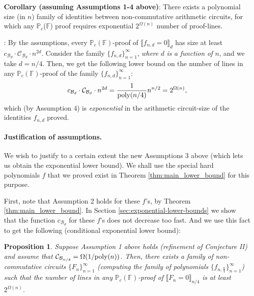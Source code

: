 \documentclass[12pt,reqno]{article}
\newcommand{\Comment}[1]{}%
\newtheorem*{proposition*}{Proposition}
\newcommand\F{\ensuremath{\mathbb F}}
\newcommand\PP{{\mathbb P}}
\newcommand\PC{\ensuremath{\PP_c}}
\newcommand{\poly}{\hbox{poly}}
\newcommand{\cd}{\cdot}
\newcommand {\ind} {\noindent}
\newcommand {\para}[1] {\paragraph{#1}}
\newenvironment{proof}{\QuadSpace\par\noindent{\bf Proof}:}{\EndProof\HalfSpace}
\newcommand{\QuadSpace}{\vspace{0.25\baselineskip}}
\newcommand{\HalfSpace}{\vspace{0.5\baselineskip}}
\newcommand{\EndProof}{ \hfill \vrule width 1ex height 1ex depth 0pt }
\begin{document}
\ind\textbf{Corollary (assuming Assumptions 1-4 above)}:
There exists a polynomial size (in $n$) family of identities between non-commutative arithmetic circuits, for which any \PC(\F) proof requires exponential $2^{\Omega(n)}$ number of proof-lines.

\begin{proof} By the assumptions, every $\PC(\F)$-proof of $\llbracket f_{n,d}=0 \rrbracket_d$ has size at least $c_{\mathcal B_d}\cd
\mathcal C_{\mathcal B_d}\cd n^{2d}$.  Consider the family $\{ f_{n,d}\}_{n=1}^\infty$, \textit{where $d$ is a function of $n$}, and we take  $d=n/4$. Then, we get the following lower bound on the number of lines in any    $\PC(\F)$-proof of the family $\{ f_{n,d}\}_{n=1}^\infty$:
\[c_{\mathcal B_d}\cd \mathcal C_{\mathcal B_d}\cd n^{2d}=\frac{1}{\poly(n/4)}n^{n/2}= 2^{\Omega(n)}
,
 \]
which (by Assumption 4) is \textit{exponential} in the arithmetic circuit-size of the identities \(f_{n,d}\) proved.
\end{proof}
\para{Justification of assumptions.}


We wish to justify to a certain extent the new Assumptions 3 above (which lets us obtain the exponential lower bound). We shall use the special hard polynomials $f$ that we proved exist in Theorem \ref{thm:main_lower_bound} for this purpose.

First, note that Assumption 2 holds for these $f$'s, by Theorem \ref{thm:main_lower_bound}.
  In Section \ref{sec:exponential-lower-bounds} we show that the function $c_{\mathcal B_d}$ for these $f$'s does not decrease too fast.
And we use this fact to get the following (conditional exponential lower bound):


\Comment{
That is, for the polynomial $f$ we can prove the following:
 $$Q_{\mathcal B_{n/4}}(f)=\Omega\left(\frac{2^n}{n^{5/2}\ln n}\right).$$
}


\begin{proposition*}
Suppose \emph{Assumption 1} above holds (refinement of Conjecture II) and assume that $\mathcal C_{\mathcal B_{n/4}}=
\Omega(1/{\rm poly}(n))$. Then, there exists a  family of
non-commutative circuits $\{F_n\}_{n=1}^\infty$ (computing the family of polynomials $\{f_{n,\frac{n}{4}}\}_{n=1}^\infty$)
such that  the number of lines in any $\PC(\F)$-proof of $\llbracket F_n= 0\rrbracket_{n/4}$ is at least $2^{\Omega(n)}$.
%
%
\end{proposition*}
\end{document}

